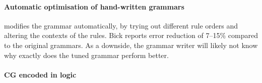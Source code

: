 



\paragraph{Automatic optimisation of hand-written grammars }

 modifies the grammar automatically, by trying
out different rule orders and altering the contexts of the rules.
Bick reports error reduction of 7--15\% compared to the original grammars.
As a downside, the grammar writer will likely not know why exactly does the tuned grammar perform better.



\paragraph{CG encoded in logic}

